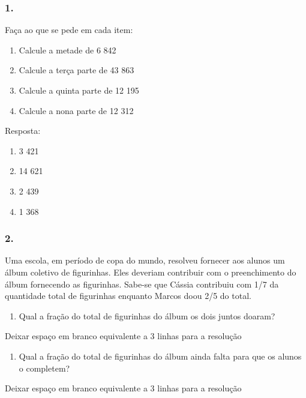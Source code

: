 \subsubsection{1.}\label{section-104}

Faça ao que se pede em cada item:

\begin{enumerate}
\def\labelenumi{\alph{enumi})}
\item
  Calcule a metade de 6 842
\item
  Calcule a terça parte de 43 863
\item
  Calcule a quinta parte de 12 195
\item
  Calcule a nona parte de 12 312
\end{enumerate}

Resposta:

\begin{enumerate}
\def\labelenumi{\alph{enumi})}
\item
  3 421
\item
  14 621
\item
  2 439
\item
  1 368
\end{enumerate}

\subsubsection{2.}\label{section-105}

Uma escola, em período de copa do mundo, resolveu fornecer aos alunos um
álbum coletivo de figurinhas. Eles deveriam contribuir com o
preenchimento do álbum fornecendo as figurinhas. Sabe-se que Cássia
contribuiu com 1/7 da quantidade total de figurinhas enquanto Marcos
doou 2/5 do total.

\begin{enumerate}
\def\labelenumi{\alph{enumi})}
\item
  Qual a fração do total de figurinhas do álbum os dois juntos doaram?
\end{enumerate}

Deixar espaço em branco equivalente a 3 linhas para a resolução

\begin{enumerate}
\def\labelenumi{\alph{enumi})}
\item
  Qual a fração do total de figurinhas do álbum ainda falta para que os
  alunos o completem?
\end{enumerate}

Deixar espaço em branco equivalente a 3 linhas para a resolução

